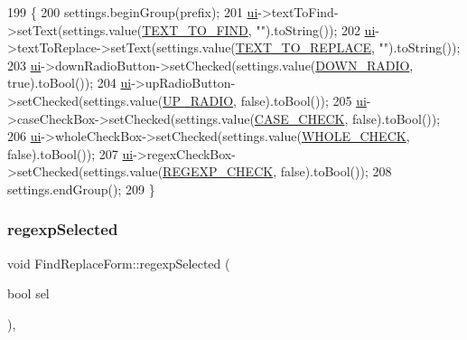 \begin{DoxyCode}
199                                                                              \{
200     settings.beginGroup(prefix);
201     \hyperlink{class_find_replace_form_a9bf9e9096feff863dcd6c2a989e07d2c}{ui}->textToFind->setText(settings.value(\hyperlink{findreplaceform_8cpp_ad0e85b6e1a23bc6895c0b0173fe84fb8}{TEXT\_TO\_FIND}, \textcolor{stringliteral}{""}).toString());
202     \hyperlink{class_find_replace_form_a9bf9e9096feff863dcd6c2a989e07d2c}{ui}->textToReplace->setText(settings.value(\hyperlink{findreplaceform_8cpp_ae47c14ca9975586733a09e6d551dad02}{TEXT\_TO\_REPLACE}, \textcolor{stringliteral}{""}).toString());
203     \hyperlink{class_find_replace_form_a9bf9e9096feff863dcd6c2a989e07d2c}{ui}->downRadioButton->setChecked(settings.value(\hyperlink{findreplaceform_8cpp_a47c8ca9e44c58a42f6fe68e4203a013e}{DOWN\_RADIO}, \textcolor{keyword}{true}).toBool());
204     \hyperlink{class_find_replace_form_a9bf9e9096feff863dcd6c2a989e07d2c}{ui}->upRadioButton->setChecked(settings.value(\hyperlink{findreplaceform_8cpp_a8c493bff457c3ec968f611c4d562e2ba}{UP\_RADIO}, \textcolor{keyword}{false}).toBool());
205     \hyperlink{class_find_replace_form_a9bf9e9096feff863dcd6c2a989e07d2c}{ui}->caseCheckBox->setChecked(settings.value(\hyperlink{findreplaceform_8cpp_a187fe30bbd8393046e13732d0ced8e39}{CASE\_CHECK}, \textcolor{keyword}{false}).toBool());
206     \hyperlink{class_find_replace_form_a9bf9e9096feff863dcd6c2a989e07d2c}{ui}->wholeCheckBox->setChecked(settings.value(\hyperlink{findreplaceform_8cpp_a30b2264592edd78f0d0a3a9b67cdfaf8}{WHOLE\_CHECK}, \textcolor{keyword}{false}).toBool());
207     \hyperlink{class_find_replace_form_a9bf9e9096feff863dcd6c2a989e07d2c}{ui}->regexCheckBox->setChecked(settings.value(\hyperlink{findreplaceform_8cpp_a19c3030804a7b73372b7d4de85d75804}{REGEXP\_CHECK}, \textcolor{keyword}{false}).toBool());
208     settings.endGroup();
209 \}
\end{DoxyCode}
\mbox{\label{class_find_replace_form_acbde49b9b3e2efd6940f8d2e16b9172c}} 
\subsubsection{\texorpdfstring{regexp\+Selected}{regexpSelected}}
{\footnotesize\ttfamily void Find\+Replace\+Form\+::regexp\+Selected (\begin{DoxyParamCaption}\item[{bool}]{sel }\end{DoxyParamCaption})\hspace{0.3cm}{\ttfamily [protected]}, {\ttfamily [slot]}}



